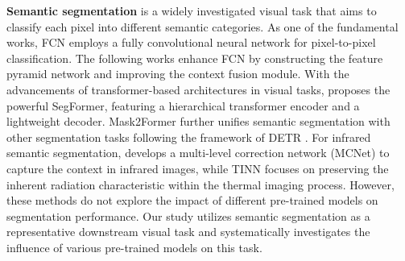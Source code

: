 \textbf{Semantic segmentation} is a widely investigated visual task that aims to classify each pixel into different semantic categories. As one of the fundamental works, FCN \citep{fcn} employs a fully convolutional neural network for pixel-to-pixel classification. The following works \citep{deeplabv3+,pspnet,upernet} enhance FCN by constructing the feature pyramid network and improving the context fusion module. With the advancements of transformer-based architectures in visual tasks, \citet{segformer} proposes the powerful SegFormer, featuring a hierarchical transformer encoder and a lightweight decoder. Mask2Former \citep{mask2former} further unifies semantic segmentation with other segmentation tasks following the framework of DETR \citep{detr}. For infrared semantic segmentation, \citet{mcnet} develops a multi-level correction network (MCNet) to capture the context in infrared images, while TINN \citep{tinn} focuses on preserving the inherent radiation characteristic within the thermal imaging process. However, these methods do not explore the impact of different pre-trained models on segmentation performance. Our study utilizes semantic segmentation as a representative downstream visual task and systematically investigates the influence of various pre-trained models on this task.
